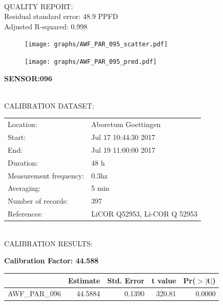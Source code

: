 \documentclass[oneside]{report}
\begin{document}
\hrulefill\\
QUALITY REPORT:\\
Residual standard error: 48.9 PPFD\\
Adjusted R-squared: 0.998



\begin{figure}[H]
  \centering
  \texttt{[image: graphs/AWF\_PAR\_095\_scatter.pdf]}
\end{figure}




\begin{figure}[H]
  \centering
  \texttt{[image: graphs/AWF\_PAR\_095\_pred.pdf]}
\end{figure}

\pagebreak


\begin{center}
\large{\textbf{SENSOR:096}}\\
\end{center}

\hrulefill\\
CALIBRATION DATASET:\\
\begin{table}[h!]
  \centering
  \label{tab:table1}
  \begin{tabular}{ll}
    Location: & Aboretum Goettingen\\ 
    
    
    Start:  & Jul 17 10:44:30 2017 \\
    End:   & Jul 19 11:00:00 2017\\ 
    Duration: & 48 h\\
    Measurement frequency: & 0.3hz\\
    Averaging:  &5 min\\
    Number of records: & 397 \\
    References: & LiCOR Q52953, Li-COR Q 52953 \\
  \end{tabular}
\end{table}

\hrulefill\\
CALIBRATION RESULTS:\\


\begin{center}
\textbf{\large{Calibration Factor: 44.588}}\\
\end{center}
\begin{table}[ht]
\centering
\begin{tabular}{rrrrr}
  \hline
 & Estimate & Std. Error & t value & Pr($>$$|$t$|$) \\ 
  \hline
AWF\_PAR\_096 & 44.5884 & 0.1390 & 320.81 & 0.0000 \\ 
   \hline
\end{tabular}
\end{table}
\end{document}

